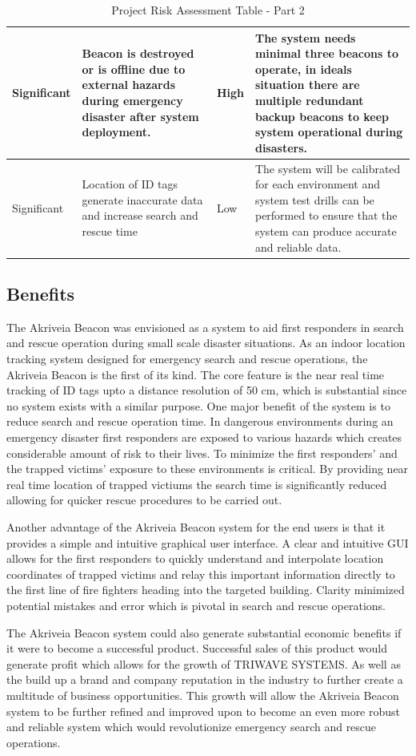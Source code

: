 \begin{table}[H]
\begin{tabular}{ | m{1.6cm} | m{4cm}| m{2cm} | m{7.4cm}|}
\hline
Significant & Beacon is destroyed or is offline due to external hazards during emergency disaster after system deployment. & High & The system needs minimal three beacons to operate, in ideals situation there are multiple redundant backup beacons to keep system operational during disasters. \\
\hline
Significant & Location of ID tags generate inaccurate data and increase  search and rescue time & Low & The system will be calibrated for each environment and system test drills can be performed to ensure that the system can produce accurate and reliable data. \\
\hline
\end{tabular}
\caption{Project Risk Assessment Table - Part 2}
\end{table}	


\pagebreak
\subsection{Benefits}
\medskip
The Akriveia Beacon was envisioned as a system to aid first responders in search and rescue operation during small scale disaster situations. As an indoor location tracking system designed for emergency search and rescue operations, the Akriveia Beacon is the first of its kind. The core feature is the near real time tracking of ID tags upto a distance resolution of 50 cm, which is substantial since no system exists with a similar purpose. One major benefit of the system is to reduce search and rescue operation time. In dangerous environments during an emergency disaster first responders are exposed to various hazards which creates considerable amount of risk to their lives. To minimize the first responders’ and the trapped victims' exposure to these environments is critical. By providing near real time location of trapped victiums the search time is significantly reduced allowing for quicker rescue procedures to be carried out.

\bigskip
Another advantage of the Akriveia Beacon system for the end users is that it provides a simple and intuitive graphical user interface. A clear and intuitive GUI allows for the first responders to quickly understand and interpolate location coordinates of trapped victims and relay this important information directly to the first line of fire fighters heading into the targeted building. Clarity minimized potential mistakes and error which is pivotal in search and rescue operations.

\bigskip
The Akriveia Beacon system could also generate substantial economic benefits if it were to become a successful product. Successful sales of this product would generate profit which allows for the growth of TRIWAVE SYSTEMS. As well as the build up a brand and company reputation in the industry to further create a multitude of business opportunities. This growth will allow the Akriveia Beacon system to be further refined and improved upon to become an even more robust and reliable system which would revolutionize emergency search and rescue operations.

